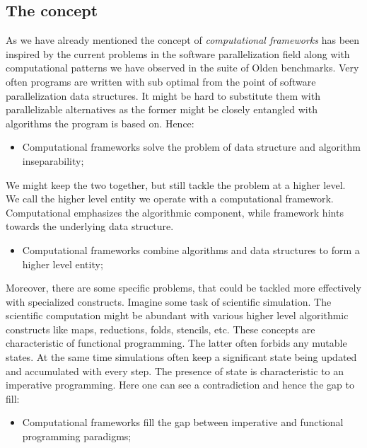 \subsection{The concept}
\label{frameworks_concept}
\quad As we have already mentioned the concept of \textit{computational frameworks} has been inspired by the current problems in the software parallelization field along with computational patterns we have observed in the suite of Olden benchmarks. Very often programs are written with sub optimal from the point of software parallelization data structures. It might be hard to substitute them with parallelizable alternatives as the former might be closely entangled with algorithms the program is based on. Hence:
\begin{itemize}[style=unboxed,leftmargin=0cm]
\itemsep0em
\renewcommand\labelitemi{$\vartriangleright$}
\renewcommand\labelitemii{$\bullet$}
\item Computational frameworks solve the problem of data structure and algorithm inseparability;
\end{itemize}
\quad We might keep the two together, but still tackle the problem at a higher level. We call the higher level entity we operate with a computational framework. Computational emphasizes the algorithmic component, while framework hints towards the underlying data structure. 
\begin{itemize}[style=unboxed,leftmargin=0cm]
\itemsep0em
\renewcommand\labelitemi{$\vartriangleright$}
\renewcommand\labelitemii{$\bullet$}
\item Computational frameworks combine algorithms and data structures to form a higher level entity;
\end{itemize}
\quad Moreover, there are some specific problems, that could be tackled more effectively with specialized constructs. Imagine some task of scientific simulation. The scientific computation might be abundant with various higher level algorithmic constructs like maps, reductions, folds, stencils, etc. These concepts are characteristic of functional programming. The latter often forbids any mutable states. At the same time simulations often keep a significant state being updated and accumulated with every step. The presence of state is characteristic to an imperative programming. Here one can see a contradiction and hence the gap to fill: \begin{itemize}[style=unboxed,leftmargin=0cm]
\itemsep0em
\renewcommand\labelitemi{$\vartriangleright$}
\renewcommand\labelitemii{$\bullet$}
\item Computational frameworks fill the gap between imperative and functional programming paradigms;
\end{itemize}
